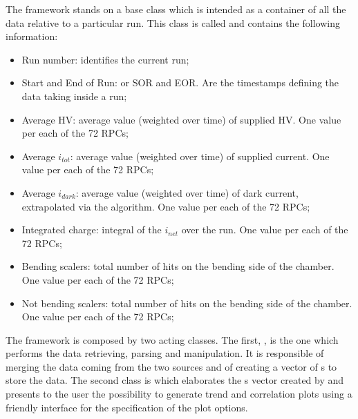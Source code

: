 The framework stands on a base class which is intended as a container of all the data relative to a particular run.
This class is called  and contains the following information:
\begin{itemize}
\item Run number: identifies the current run;
\item Start and End of Run: or SOR and EOR. Are the timestamps defining the data taking inside a run;
\item Average HV: average value (weighted over time) of supplied HV. One value per each of the 72 RPCs;
\item Average $i_{tot}$: average value (weighted over time) of supplied current.  One value per each of the 72 RPCs;
\item Average $i_{dark}$: average value (weighted over time) of dark current, extrapolated via the algorithm.  One value per each of the 72 RPCs;
\item Integrated charge: integral of the $i_{net}$ over the run.  One value per each of the 72 RPCs;
\item Bending scalers: total number of hits on the bending side of the chamber.  One value per each of the 72 RPCs;
\item Not bending scalers: total number of hits on the bending side of the chamber.  One value per each of the 72 RPCs;
\end{itemize}

The framework is composed by two acting classes.
The first, , is the one which performs the data retrieving, parsing and manipulation.
It is responsible of merging the data coming from the two sources and of creating a vector of s to store the data.
The second class is  which elaborates the s vector created by  and presents to the user the possibility to generate trend and correlation plots using a friendly interface for the specification of the plot options.

